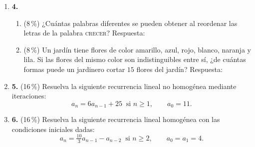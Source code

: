 \documentclass[11pt]{article}
\newcommand{\resp}{\underline{\hspace{3cm}}}
\begin{document}
\begin{enumerate}
\item[]\textbf{4.}
\begin{enumerate}[label=(\alph*)]
\item (8\,\%) ¿Cuántas palabras diferentes se pueden obtener al reordenar las letras de la palabra \textsc{crecer}? \hfill Respuesta: \resp
\item (8\,\%) Un jardín tiene flores de color amarillo, azul, rojo, blanco, naranja y lila. Si las flores del mismo color son indistinguibles entre sí, ¿de cuántas formas puede un jardinero cortar $15$ flores del jardín? \hfill Respuesta: \resp
\end{enumerate}

\item[]\textbf{5.} (16\,\%) Resuelva la siguiente recurrencia lineal no homogénea mediante iteraciones:
\[
a_n = 6 a_{n-1} + 25 \ \text{ si } n \geq 1, \qquad a_0 = 11.
\]

\item[]\textbf{6.} (16\,\%) Resuelva la siguiente recurrencia lineal homogénea con las condiciones iniciales dadas:
\[
a_n = \tfrac{10}{3} a_{n-1} - a_{n-2} \ \text{ si } n \geq 2, \qquad a_0 = a_1 = 4.
\]
\end{enumerate}

\vfill
{}
\end{document}
